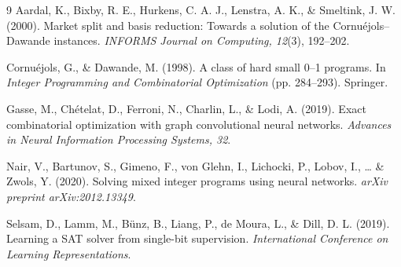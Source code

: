 \documentclass[12pt]{article}
\begin{document}
\begin{thebibliography}{9}
Aardal, K., Bixby, R. E., Hurkens, C. A. J., Lenstra, A. K., \& Smeltink, J. W. (2000). Market split and basis reduction: Towards a solution of the Cornu\'ejols--Dawande instances. \emph{INFORMS Journal on Computing, 12}(3), 192--202.

Cornu\'ejols, G., \& Dawande, M. (1998). A class of hard small 0--1 programs. In \emph{Integer Programming and Combinatorial Optimization} (pp. 284--293). Springer.

Gasse, M., Ch\'etelat, D., Ferroni, N., Charlin, L., \& Lodi, A. (2019). Exact combinatorial optimization with graph convolutional neural networks. \emph{Advances in Neural Information Processing Systems, 32}.

Nair, V., Bartunov, S., Gimeno, F., von Glehn, I., Lichocki, P., Lobov, I., \ldots{} \& Zwols, Y. (2020). Solving mixed integer programs using neural networks. \emph{arXiv preprint arXiv:2012.13349}.

Selsam, D., Lamm, M., B\"unz, B., Liang, P., de Moura, L., \& Dill, D. L. (2019). Learning a SAT solver from single-bit supervision. \emph{International Conference on Learning Representations}.
\end{thebibliography}
\end{document}
